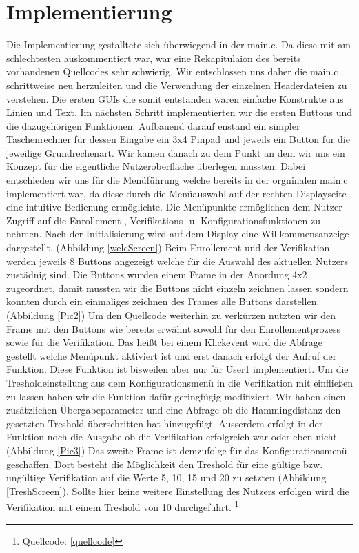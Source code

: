 \section{Implementierung}

Die Implementierung gestalltete sich \"uberwiegend in der main.c. Da diese mit am schlechtesten auskommentiert war, war eine Rekapitulaion des bereits vorhandenen Quellcodes sehr schwierig. Wir entschlossen uns daher die main.c schrittweise neu herzuleiten und die Verwendung der einzelnen Headerdateien zu verstehen. Die ersten GUIs die somit entstanden waren einfache Konstrukte aus Linien und Text. Im n\"achsten Schritt implementierten wir die ersten Buttons und die dazugeh\"origen Funktionen. Aufbauend darauf enstand ein simpler Taschenrechner f\"ur dessen Eingabe ein 3x4 Pinpad und jeweils ein Button f\"ur die jeweilige Grundrechenart. Wir kamen danach zu dem Punkt an dem wir uns ein Konzept f\"ur die eigentliche Nutzeroberfl\"ache \"uberlegen mussten. Dabei entschieden wir uns f\"ur die Men\"uf\"uhrung welche bereits in der orgninalen main.c implementiert war, da diese durch die Men\"uauswahl auf der rechten Displayseite eine intuitive Bedienung erm\"oglichte. Die Men\"upunkte erm\"oglichen dem Nutzer Zugriff auf die Enrollement-, Verifikations- u. Konfigurationsfunktionen zu nehmen. Nach der Initialisierung wird auf dem Display eine Willkommensanzeige dargestellt. (Abbildung \ref{welcScreen}) Beim Enrollement und der Verifikation werden jeweils 8 Buttons angezeigt welche f\"ur die Auswahl des aktuellen Nutzers zust\"adnig sind. Die Buttons wurden einem Frame in der Anordung 4x2 zugeordnet, damit mussten wir die Buttons nicht einzeln zeichnen lassen sondern konnten durch ein einmaliges zeichnen des Frames alle Buttons darstellen. (Abbildung \ref{Pic2}) Um den Quellcode weiterhin zu verk\"urzen nutzten wir den Frame mit den Buttons wie bereits erw\"ahnt sowohl f\"ur den Enrollementprozess sowie f\"ur die Verifikation. Das hei{\ss}t bei einem Klickevent wird die Abfrage gestellt welche Men\"upunkt aktiviert ist und erst danach erfolgt der Aufruf der Funktion. Diese Funktion ist bisweilen aber nur f\"ur User1 implementiert. Um die Tresholdeinstellung aus dem Konfigurationsmen\"u in die Verifikation mit einflie{\ss}en zu lassen haben wir die Funktion daf\"ur geringf\"ugig modifiziert. Wir haben einen zus\"atzlichen \"Ubergabeparameter und eine Abfrage ob die Hammingdistanz den gesetzten Treshold \"uberschritten hat hinzugef\"ugt. Ausserdem erfolgt in der Funktion noch die Ausgabe ob die Verifikation erfolgreich war oder eben nicht.(Abbildung \ref{Pic3}) Das zweite Frame ist demzufolge f\"ur das Konfigurationsmen\"u geschaffen. Dort besteht die M\"oglichkeit den Treshold f\"ur eine g\"ultige bzw. ung\"ultige Verifikation auf die Werte 5, 10, 15 und 20 zu setzten (Abbildung \ref{TreshScreen}). Sollte hier keine weitere Einstellung des Nutzers erfolgen wird die Verifikation mit einem Treshold von 10 durchgef\"uhrt. \footnote{\label{foot:1} Quellcode: \ref{quellcode}}

